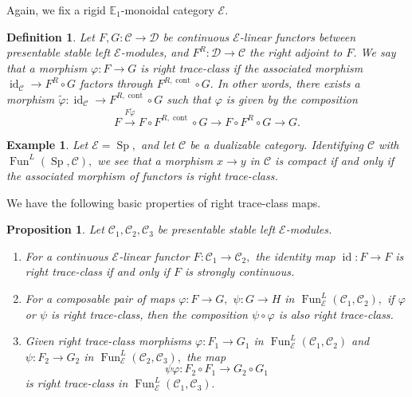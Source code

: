 \documentclass[11pt,leqno]{amsart}
\newtheorem{defi}[theo]{Definition}
\newtheorem{prop}[theo]{Proposition}
\newtheorem{example}[theo]{Example}
\numberwithin{equation}{section}
\def\wt{\widetilde}
\newcommand{\xto}{\xrightarrow}
\newcommand{\cont}{\operatorname{cont}}
\newcommand{\bE}{{\mathbb E}}
\newcommand{\cD}{{\mathcal D}}
\newcommand{\cC}{{\mathcal C}}
\newcommand{\cE}{{\mathcal E}}
\newcommand{\Fun}{\operatorname{Fun}}
\newcommand{\Sp}{\operatorname{Sp}}
\newcommand{\id}{\operatorname{id}}
\begin{document}
Again, we fix a rigid $\bE_1$-monoidal category $\cE.$

\begin{defi}\label{def:right_trace_class} Let $F,G:\cC\to\cD$ be continuous $\cE$-linear functors between presentable stable left $\cE$-modules, and $F^R:\cD\to\cC$ the right adjoint to $F$. We say that a morphism $\varphi:F\to G$ is right trace-class if the associated morphism $\id_{\cC}\to F^R\circ G$ factors through $F^{R,\cont}\circ G.$ In other words, there exists a morphism $\wt{\varphi}:\id_{\cC}\to F^{R,\cont}\circ G$ such that $\varphi$ is given by the composition
\begin{equation*}
F\xto{F\wt{\varphi}}F\circ F^{R,\cont}\circ G\to F\circ F^R\circ G\to G. 	
\end{equation*}\end{defi}

\begin{example}
Let $\cE=\Sp,$ and let $\cC$ be a dualizable category. Identifying $\cC$ with $\Fun^L(\Sp,\cC),$ we see that a morphism $x\to y$ in $\cC$ is compact if and only if the associated morphism of functors is right trace-class.
\end{example}

We have the following basic properties of right trace-class maps.

\begin{prop}\label{prop:right_trace_class_basics}
Let $\cC_1,\cC_2,\cC_3$ be presentable stable left $\cE$-modules.
\begin{enumerate}[label=(\roman*), ref=(\roman*)]
\item For a continuous $\cE$-linear functor $F:\cC_1\to\cC_2,$ the identity map $\id:F\to F$ is right trace-class if and only if $F$ is strongly continuous. \label{identity_map_right_trace_class}
\item For a composable pair of maps $\varphi:F\to G,$ $\psi:G\to H$ in $\Fun^L_{\cE}(\cC_1,\cC_2),$ if $\varphi$ or $\psi$ is right trace-class, then the composition $\psi\circ \varphi$ is also right trace-class. \label{right_trace_class_2_sided_ideal}
\item Given right trace-class morphisms $\varphi:F_1\to G_1$ in $\Fun^L_{\cE}(\cC_1,\cC_2)$ and $\psi:F_2\to G_2$ in $\Fun^L_{\cE}(\cC_2,\cC_3),$ the map
\begin{equation*}
\psi\varphi:F_2\circ F_1\to G_2\circ G_1
\end{equation*}
is right trace-class in $\Fun^L_{\cE}(\cC_1,\cC_3).$ \label{right_trace_class_between_compositions}
\end{enumerate}
\end{prop}
\end{document}
